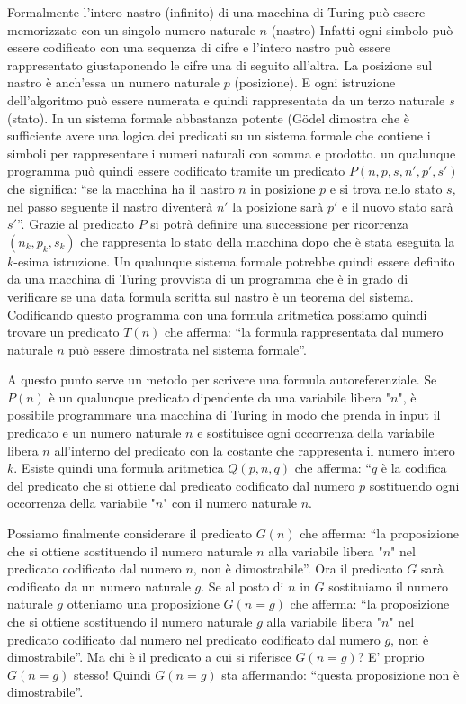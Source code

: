 \documentclass[italian,a4paper,hidelinks,headinclude]{scrartcl}
\begin{document}
Formalmente l'intero nastro (infinito) di una macchina
di Turing può essere memorizzato con un singolo numero naturale $n$ (nastro)
Infatti ogni simbolo può essere codificato con una
sequenza di cifre e l'intero nastro può essere rappresentato
giustaponendo le cifre una di seguito all'altra.
La posizione sul nastro è anch'essa un numero naturale $p$ (posizione).
E ogni istruzione dell'algoritmo può essere numerata
e quindi rappresentata da un terzo naturale $s$ (stato).
In un sistema formale abbastanza potente
(G\"odel dimostra che è sufficiente avere una logica
dei predicati su un sistema formale che contiene
i simboli per rappresentare i numeri naturali con somma
e prodotto.
un qualunque programma può quindi essere codificato tramite
un predicato $P(n,p,s,n',p',s')$ che significa:
``se la macchina ha il nastro $n$ in posizione $p$
e si trova nello stato $s$, nel passo seguente
il nastro diventerà $n'$ la posizione sarà $p'$ e il nuovo
stato sarà $s'$''.
Grazie al predicato $P$ si potrà definire una successione
per ricorrenza $(n_k,p_k,s_k)$ che rappresenta
lo stato della macchina dopo che è stata eseguita
la $k$-esima istruzione.
Un qualunque sistema formale potrebbe quindi essere definito
da una macchina di Turing provvista di un programma
che è in grado di verificare se una data formula
scritta sul nastro è un teorema del sistema.
Codificando questo programma con una formula aritmetica
possiamo quindi trovare un predicato $T(n)$ che
afferma: ``la formula rappresentata dal numero naturale $n$
può essere dimostrata nel sistema formale''.

A questo punto serve un metodo per scrivere una formula
autoreferenziale. Se $P(n)$ è un qualunque predicato
dipendente da una variabile libera "$n$", è possibile
programmare una macchina di Turing in modo che
prenda in input il predicato e un numero naturale $n$
e sostituisce ogni occorrenza della variabile libera
$n$ all'interno del predicato
con la costante che rappresenta il numero intero $k$.
Esiste quindi una formula aritmetica $Q(p,n,q)$
che afferma: ``$q$ è la codifica del predicato
che si ottiene dal predicato codificato dal numero $p$
sostituendo ogni occorrenza della variabile "$n$" con il
numero naturale $n$.

Possiamo finalmente considerare il predicato $G(n)$
che afferma: ``la proposizione che si ottiene sostituendo
il numero naturale $n$ alla variabile libera "$n$" nel
predicato codificato dal numero $n$, non è dimostrabile''.
Ora il predicato $G$ sarà codificato da un numero naturale
$g$. Se al posto di $n$ in $G$ sostituiamo il numero
naturale $g$ otteniamo una proposizione $G(n=g)$ che afferma:
``la proposizione che si ottiene sostituendo il numero
naturale $g$ alla variabile libera "$n$" nel predicato
codificato dal numero nel predicato codificato dal numero
$g$, non è dimostrabile''.
Ma chi è il predicato a cui si riferisce $G(n=g)$?
E' proprio $G(n=g)$ stesso! Quindi $G(n=g)$ sta
affermando: ``questa proposizione non è dimostrabile''.
\end{document}
